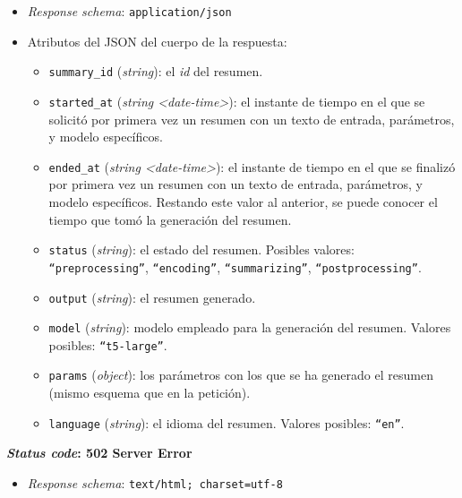\vspace{-0.3cm}
\begin{itemize} [\textbullet]
	\item \emph{Response schema}: \texttt{application/json}
	\item Atributos del JSON del cuerpo de la respuesta:
	\begin{itemize} [◦]
		\item \texttt{summary\_id} (\emph{string}): el \emph{id} del resumen.
		
		\item \texttt{started\_at} (\emph{string <date-time>}): el instante de tiempo en el que se solicitó por primera vez un resumen con un texto de entrada, parámetros, y modelo específicos.
		
		\item \texttt{ended\_at} (\emph{string <date-time>}): el instante de tiempo en el que se finalizó por primera vez un resumen con un texto de entrada, parámetros, y modelo específicos. Restando este valor al anterior, se puede conocer el tiempo que tomó la generación del resumen.
		
		\item \texttt{status} (\emph{string}): el estado del resumen. Posibles valores: \texttt{``preprocessing''}, \texttt{``encoding''}, \texttt{``summarizing''}, \texttt{``postprocessing''}.
		
		\item \texttt{output} (\emph{string}): el resumen generado.
		
		\item \texttt{model} (\emph{string}): modelo empleado para la generación del resumen. Valores posibles: \texttt{``t5-large''}.
		
		\item \texttt{params} (\emph{object}): los parámetros con los que se ha generado el resumen (mismo esquema que en la petición).
		
		\item \texttt{language}  (\emph{string}): el idioma del resumen. Valores posibles: \texttt{``en''}.
	\end{itemize}
\end{itemize}

\textbf{\emph{Status code}: 502 Server Error}

\vspace{-0.3cm}
\begin{itemize} [\textbullet]
	\item \emph{Response schema}: \texttt{text/html; charset=utf-8}
\end{itemize}

